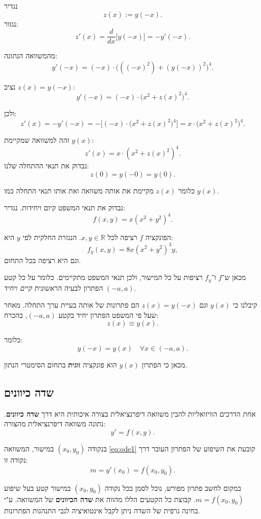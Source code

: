\documentclass{article}
\numberwithin{equation}{section}
\begin{document}
נגדיר
\[
z(x) := y(-x).
\] 
נגזור:
\[
z'(x) = \frac{d}{dx}\big[y(-x)\big] = -y'(-x).
\]

מהמשוואה הנתונה:
\[
y'(-x) = (-x)\cdot\Big(((-x)^2)+(y(-x))^2\Big)^4.
\]

נציב $z(x)=y(-x)$:
\[
y'(-x) = (-x)\cdot\big(x^2+z(x)^2\big)^4.
\]

ולכן:
\[
z'(x) = -y'(-x) 
= -\Big[(-x)\cdot\big(x^2+z(x)^2\big)^4\Big] 
= x\cdot\big(x^2+z(x)^2\big)^4.
\]

זהה למשוואה שמקיימת $y(x)$:
\[
z'(x) = x \cdot (x^2+z(x)^2)^4.
\]
נבדוק את תנאי ההתחלה שלנו:
\[
z(0) = y(-0) = y(0).
\]

כלומר $z(x)$ מקיימת את אותה משוואה ואת אותו תנאי התחלה כמו $y(x)$.

נבדוק את תנאי המשפט קיום ויחידות.
נגדיר:
\[
f(x,y) = x(x^2+y^2)^4.
\]

הפונקציה $f$ רציפה לכל $x,y \in \mathbb{R}$.  
הנגזרת החלקית לפי $y$ היא:
\[
f_y(x,y) = 8x(x^2+y^2)^3y,
\]
וגם היא רציפה בכל התחום.  

מכאן ש־$f$ ו־$f_y$ רציפות על כל המישור, ולכן תנאי המשפט מתקיימים.  
כלומר על כל קטע $(-a,a)$ הפתרון לבעיה הראשונית \emph{קיים ויחיד}.  

קיבלנו כי $y(x)$ וגם $z(x)=y(-x)$ הם פתרונות של אותה בעיית ערך התחלה.  
מאחר שעל פי המשפט הפתרון יחיד בקטע $(-a,a)$, בהכרח:
\[
z(x) \equiv y(x).
\]

כלומר:
\[
y(-x) = y(x) \quad \forall x \in (-a,a).
\]
  
מכאן כי הפתרון $y(x)$ הוא פונקציה \textbf{זוגית} בתחום הסימטרי הנתון.

\newpage
\subsection{שדה כיוונים}

אחת הדרכים הוויזואליות להבין משוואה דיפרנציאלית בצורה איכותית היא דרך \textbf{שדה כיוונים}.  
נתונה משוואה דיפרנציאלית מהצורה:
\begin{equation}\label{eq:ode1}
y' = f(x,y).
\end{equation}

בנקודה $(x_0,y_0)$ במישור, המשוואה \eqref{eq:ode1} קובעת את השיפוע של הפתרון העובר דרך נקודה זו:
\[
m = y'(x_0) = f(x_0,y_0).
\]

במקום לחשב פתרון מפורש, נוכל לסמן בכל נקודה $(x_0,y_0)$ במישור קטע בעל שיפוע $m=f(x_0,y_0)$.  
קבוצת כל הקטעים הללו מהווה את \textbf{שדה הכיוונים} של המשוואה.  
ע"י בחינה גרפית של השדה ניתן לקבל אינטואיציה לגבי התנהגות הפתרונות.
\end{document}
